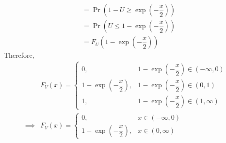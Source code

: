 \documentclass[journal,12pt,onecolumn]{IEEEtran}
\numberwithin{equation}{section}
\renewcommand\thesection{\arabic{section}}
\providecommand{\pr}[1]{\ensuremath{\Pr\left(#1\right)}}
\begin{document}
\begin{enumerate}[label=\thesection.\arabic*,ref=\thesection.\theenumi]
\begin{align}
              \\
                     & = \pr{1-U \geq	\exp{\left(-\dfrac{x}{2}\right)}}
              \\
                     & = \pr{U \leq 1 - \exp{\left(-\dfrac{x}{2}\right)}}
              \\
                     & = F_U\left(1 - \exp{\left(-\dfrac{x}{2}\right)}\right)
          \end{align}
          Therefore,
          \begin{align}
                       & F_V(x) =
              \begin{cases}
                  0,                                    & 1 - \exp{\left(-\dfrac{x}{2}\right)} \in (-\infty,0)
                  \\
                  1 - \exp{\left(-\dfrac{x}{2}\right)}, & 1 - \exp{\left(-\dfrac{x}{2}\right)} \in (0,1)
                  \\
                  1,                                    & 1 - \exp{\left(-\dfrac{x}{2}\right)} \in (1, \infty)
              \end{cases}
              \\
              \implies & F_V(x) =
              \begin{cases}
                  0,                                    & x \in (-\infty,0)
                  \\
                  1 - \exp{\left(-\dfrac{x}{2}\right)}, & x \in (0,\infty)
              \end{cases}
          \end{align}
\end{enumerate}
\end{document}
